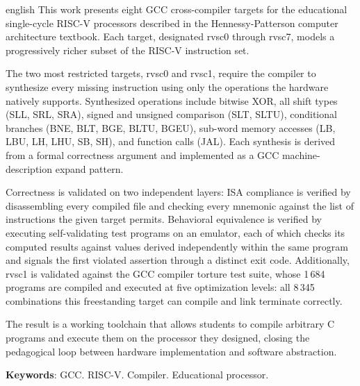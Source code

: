 \documentclass[
	12pt,				%
	openright,			%
	twoside,			%
	a4paper,			%
	english,			%
	french,				%
	spanish,			%
	brazil				%
	]{abntex2}
\begin{document}
\setlength{\absparsep}{18pt} %
\begin{resumo}[Abstract]
 \begin{otherlanguage*}{english}
This work presents eight GCC cross-compiler targets for the educational single-cycle RISC-V
processors described in the Hennessy-Patterson computer architecture textbook. Each target,
designated rvsc0 through rvsc7, models a progressively richer subset of the RISC-V instruction
set.

The two most restricted targets, rvsc0 and rvsc1, require the compiler to synthesize every missing
instruction using only the operations the hardware natively supports. Synthesized operations include
bitwise XOR, all shift types (SLL, SRL, SRA), signed and unsigned comparison (SLT, SLTU),
conditional branches (BNE, BLT, BGE, BLTU, BGEU), sub-word memory accesses (LB, LBU, LH, LHU,
SB, SH), and function calls (JAL). Each synthesis is derived from a formal correctness argument and
implemented as a GCC machine-description expand pattern.

Correctness is validated on two independent layers: ISA compliance is verified by disassembling
every compiled file and checking every mnemonic
against the list of instructions the given target
permits. Behavioral equivalence is verified by executing self-validating test programs on an
emulator, each of which checks its computed results against values derived independently
within the same program and signals the first violated assertion through a distinct exit code.
Additionally, rvsc1 is validated against the GCC compiler torture test suite, whose 1\,684 programs
are compiled and executed at five optimization levels: all 8\,345 combinations this freestanding
target can compile and link terminate correctly.

The result is a working toolchain that allows students to compile arbitrary C programs and execute
them on the processor they designed, closing the pedagogical loop between hardware implementation
and software abstraction.

   \vspace{\onelineskip}

   \noindent
   \textbf{Keywords}: GCC. RISC-V. Compiler. Educational processor.
 \end{otherlanguage*}
\end{resumo}
\end{document}
